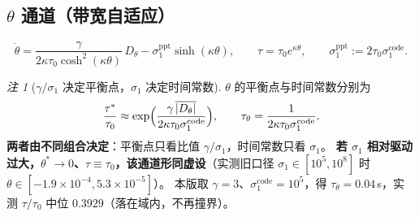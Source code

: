 \documentclass[11pt]{article}
\theoremstyle{remark}\newtheorem{remark}{注}
\newcommand{\sone}{\sigma_1^{\mathrm{ppt}}}
\begin{document}
\subsection{$\theta$ 通道（带宽自适应）}\label{sec:theta}
\begin{equation}
  \dot\theta=\frac{\gamma}{2\kappa\tau_0\cosh^{2}(\kappa\theta)}\,D_\theta-\sone\sinh(\kappa\theta),
  \qquad \tau=\tau_0e^{\kappa\theta},\qquad \sone:=2\tau_0\sigma_1^{\mathrm{code}} .
  \label{eq:theta}
\end{equation}
\begin{remark}[$\gamma/\sigma_1$ 决定平衡点，$\sigma_1$ 决定时间常数]\label{rem:theta-scale}
$\theta$ 的平衡点与时间常数分别为
\begin{equation}
  \frac{\tau^{*}}{\tau_0}\approx\exp\Bigl(\frac{\gamma\,\overline{|D_\theta|}}{2\kappa\tau_0\sigma_1^{\mathrm{code}}}\Bigr),
  \qquad
  \tau_\theta=\frac{1}{2\kappa\tau_0\sigma_1^{\mathrm{code}}} .
  \label{eq:theta-eq}
\end{equation}
\textbf{两者由不同组合决定}：平衡点只看比值 $\gamma/\sigma_1$，时间常数只看 $\sigma_1$。
\textbf{若 $\sigma_1$ 相对驱动过大，$\theta^{*}\to0$、$\tau\equiv\tau_0$，该通道形同虚设}（实测旧口径 $\sigma_1\in[10^{5},10^{8}]$ 时 $\theta\in[-1.9\times10^{-4},5.3\times10^{-5}]$）。
本版取 $\gamma=3$、$\sigma_1^{\mathrm{code}}=10^{5}$，得 $\tau_\theta=0.04$\,s，实测 $\tau/\tau_0$ 中位 $0.3929$（落在域内，不再撞界）。
\end{remark}
\end{document}
